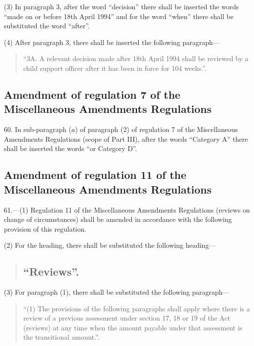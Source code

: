 \documentclass[a4paper]{article}
\begin{document}
(3) In paragraph 3, after the word “decision” there shall be inserted the words “made on or before 18th April 1994” and for the word “when” there shall be substituted the word “after”.

(4) After paragraph 3, there shall be inserted the following paragraph—
\begin{quotation}
“3A.  A relevant decision made after 18th April 1994 shall be reviewed by a child support officer after it has been in force for 104 weeks.”.
\end{quotation}

\subsection[60. Amendment of regulation 7 of the Miscellaneous Amendments Regulations]{Amendment of regulation 7 of the Miscellaneous Amendments Regulations}

60.  In sub-paragraph ($a$) of paragraph (2) of regulation 7 of the Miscellaneous Amendments Regulations (scope of Part III), after the words “Category A” there shall be inserted the words “or Category D”.

\subsection[61. Amendment of regulation 11 of the Miscellaneous Amendments Regulations]{\sloppy Amendment of regulation 11 of the Miscellaneous Amendments Regulations}

61.—(1) Regulation 11 of the Miscellaneous Amendments Regulations (reviews on change of circumstances) shall be amended in accordance with the following provision of this regulation.

(2) For the heading, there shall be substituted the following heading—
\begin{quotation}
\subsection*{“Reviews”.}
\end{quotation}

(3) For paragraph (1), there shall be substituted the following paragraph—
\begin{quotation}
“(1) The provisions of the following paragraphs shall apply where there is a review of a previous assessment under section 17, 18 or 19 of the Act (reviews) at any time when the amount payable under that assessment is the transitional amount.”.
\end{quotation}
\end{document}
